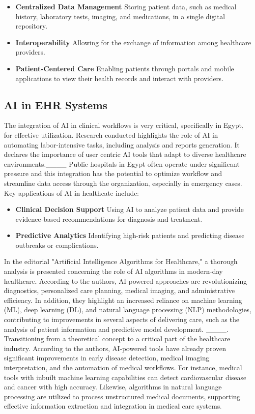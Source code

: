 \begin{itemize}
    \item \textbf{Centralized Data Management} Storing patient data, such as medical history, laboratory tests, imaging, and medications, in a single digital repository.
    \item \textbf{Interoperability} Allowing for the exchange of information among healthcare providers.
    \item \textbf{Patient-Centered Care} Enabling patients through portals and mobile applications to view their health records and interact with providers.
\end{itemize}
\subsection{AI in EHR Systems}
The integration of AI in clinical workflows is very critical, specifically in Egypt, for effective utilization. Research conducted highlights the role of AI in automating labor-intensive tasks, including analysis and reports generation. It declares the importance of user centric AI tools that adapt to diverse healthcare environments.____ 
Public hospitals in Egypt often operate under significant pressure and this integration has the potential to optimize workflow and streamline data access through the organization, especially in emergency cases. Key applications of AI in healthcate include:
\begin{itemize}
    \item \textbf{Clinical Decision Support} Using AI to analyze patient data and provide evidence-based recommendations for diagnosis and treatment.
    \item \textbf{Predictive Analytics} Identifying high-risk patients and predicting disease outbreaks or complications.
\end{itemize}
In the editorial "Artificial Intelligence Algorithms for Healthcare," a thorough analysis is presented concerning the role of AI algorithms in modern-day healthcare. According to the authors, AI-powered approaches are revolutionizing diagnostics, personalized care planning, medical imaging, and administrative efficiency. In addition, they highlight an increased reliance on machine learning (ML), deep learning (DL), and natural language processing (NLP) methodologies, contributing to improvements in several aspects of delivering care, such as the analysis of patient information and predictive model development. ____.
Transitioning from a theoretical concept to a critical part of the healthcare industry. According to the authors, AI-powered tools have already proven significant improvements in early disease detection, medical imaging interpretation, and the automation of medical workflows. For instance, medical tools with inbuilt machine learning capabilities can detect cardiovascular disease and cancer with high accuracy. Likewise, algorithms in natural language processing are utilized to process unstructured medical documents, supporting effective information extraction and integration in medical care systems.
